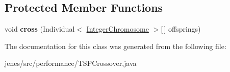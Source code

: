 \subsection*{Protected Member Functions}
\begin{DoxyCompactItemize}
\item 
\hypertarget{classjenes_1_1performance_1_1_t_s_p_crossover_a8af2cecbf7cc09cd0836148d83f76fcf}{void {\bfseries cross} (Individual$<$ \hyperlink{classjenes_1_1chromosome_1_1_integer_chromosome}{Integer\-Chromosome} $>$\mbox{[}$\,$\mbox{]} offsprings)}\label{classjenes_1_1performance_1_1_t_s_p_crossover_a8af2cecbf7cc09cd0836148d83f76fcf}

\end{DoxyCompactItemize}


The documentation for this class was generated from the following file\-:\begin{DoxyCompactItemize}
\item 
jenes/src/performance/T\-S\-P\-Crossover.\-java\end{DoxyCompactItemize}
